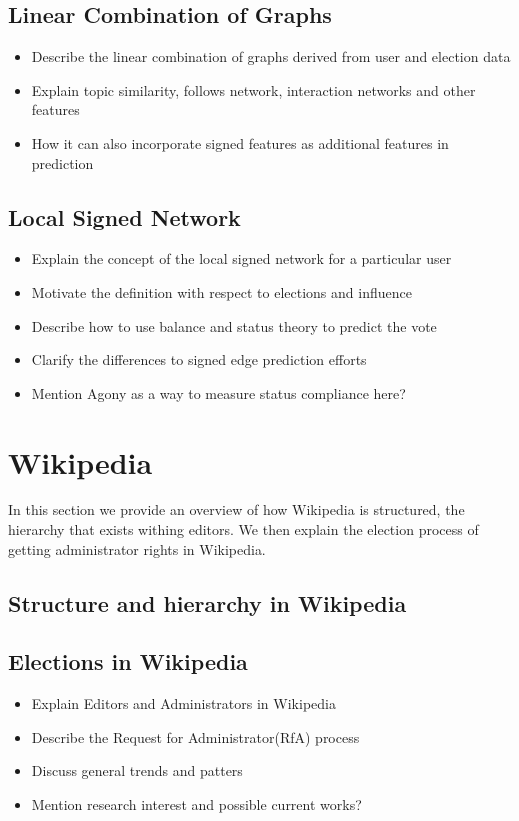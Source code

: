 \section{Linear Combination of Graphs}
\begin{itemize}
    \item Describe the linear combination of graphs derived from user and election data
    \item Explain topic similarity, follows network, interaction networks and other features
    \item How it can also incorporate signed features as additional features in prediction
\end{itemize}
\section{Local Signed Network}
\begin{itemize}
    \item Explain the concept of the local signed network for a particular user
    \item Motivate the definition with respect to elections and influence
    \item Describe how to use balance and status theory to predict the vote
    \item Clarify the differences to signed edge prediction efforts
    \item Mention Agony as a way to measure status compliance here?
\end{itemize}

\chapter{Wikipedia}
\label{chp:wikipedia}
In this section we provide an overview of how Wikipedia is structured, the hierarchy that exists withing editors. We then explain the election process of getting administrator rights in Wikipedia.

\section{Structure and hierarchy in Wikipedia}
\section{Elections in Wikipedia}
\begin{itemize}
    \item Explain Editors and Administrators in Wikipedia
    \item Describe the Request for Administrator(RfA) process
    \item Discuss general trends and patters
    \item Mention research interest and possible current works?
\end{itemize}

